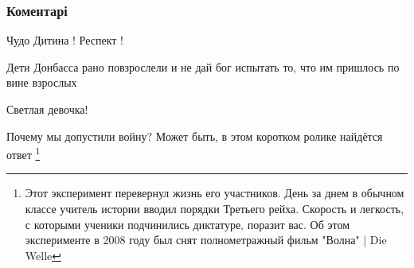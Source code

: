 
 
 
 
 
\subsubsection{Коментарі}
\label{sec:25_07_2021.fb.zharkih_denis.1.faine_savenkovoj.cmt}

\begin{itemize}
 
Чудо Дитина ! Респект !

 
Дети Донбасса рано повзрослели и не дай бог испытать то, что им пришлось по вине взрослых

 
Светлая девочка!

 
Почему мы допустили войну? Может быть, в этом коротком ролике найдётся ответ
\footnote{ Этот эксперимент перевернул жизнь его участников. День за днем в
обычном классе учитель истории вводил порядки Третьего рейха. Скорость и
легкость, с которыми ученики подчинились диктатуре, поразит вас. Об этом
эксперименте в 2008 году был снят полнометражный фильм "Волна" | Die Welle
}


\end{itemize}
